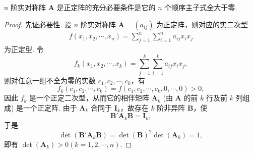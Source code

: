 \documentclass[../../main.tex]{subfiles}%
\begin{document}
\begin{theorem}\label{theorem:实正定阵的充要条件}
$n$ 阶实对称阵 $\boldsymbol{A}$ 是正定阵的充分必要条件是它的 $n$ 个顺序主子式全大于零.
\end{theorem}
\begin{proof}
先证必要性. 设 $n$ 阶实对称阵 $\boldsymbol{A}=(a_{ij})$ 为正定阵，则对应的实二次型
\begin{align*}
f(x_1,x_2,\cdots,x_n)=\sum_{j = 1}^n\sum_{i = 1}^n a_{ij}x_ix_j
\end{align*}
为正定型. 令
\[
f_k(x_1,x_2,\cdots,x_k)=\sum_{j = 1}^k\sum_{i = 1}^k a_{ij}x_ix_j,
\]
则对任意一组不全为零的实数 $c_1,c_2,\cdots,c_k$，有
\[
f_k(c_1,c_2,\cdots,c_k)=f(c_1,c_2,\cdots,c_k,0,\cdots,0)>0,
\]
因此 $f_k$ 是一个正定二次型，从而它的相伴矩阵 $\boldsymbol{A}_k$ (由 $\boldsymbol{A}$ 的前 $k$ 行及前 $k$ 列组成) 是一个正定阵. 由于 $\boldsymbol{A}_k$ 合同于 $\boldsymbol{I}_k$，故存在 $k$ 阶非异阵 $\boldsymbol{B}$，使
\[
\boldsymbol{B}'\boldsymbol{A}_k\boldsymbol{B}=\boldsymbol{I}_k,
\]
于是
\[
\det(\boldsymbol{B}'\boldsymbol{A}_k\boldsymbol{B})=\det(\boldsymbol{B})^2\det(\boldsymbol{A}_k)=1,
\]
即有 $\det(\boldsymbol{A}_k)>0 (k = 1,2,\cdots,n)$.


\end{proof}
\end{document}
